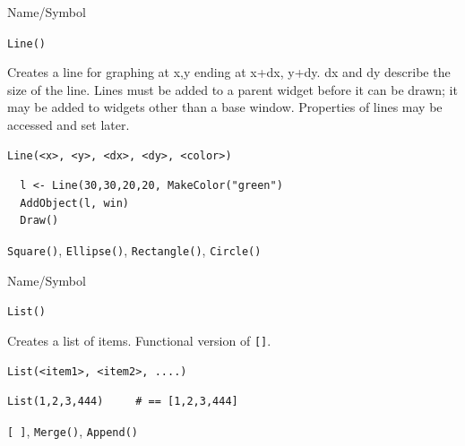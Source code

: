 \begin{desc}{Name/Symbol}
\item[Name/Symbol]	\verb+Line()+

\item[Description] Creates a line for graphing at x,y ending at x+dx,
  y+dy.  dx and dy describe the size of the line.  Lines must be added
  to a parent widget before it can be drawn; it may be added to
  widgets other than a base window. Properties of lines may be
  accessed and set later.

\item[Usage]
\begin{verbatim}
Line(<x>, <y>, <dx>, <dy>, <color>)
\end{verbatim}

\item[Example]	
\begin{verbatim}
  l <- Line(30,30,20,20, MakeColor("green")
  AddObject(l, win)
  Draw()

\end{verbatim}
\item[See Also]	\verb+Square()+, \verb+Ellipse()+, \verb+Rectangle()+, \verb+Circle()+
\end{desc}
\begin{desc}{Name/Symbol}
\item[Name/Symbol]	\verb+List()+

\item[Description]	Creates a list of items. Functional version of \verb+[]+.

\item[Usage]
\begin{verbatim}
List(<item1>, <item2>, ....)
\end{verbatim}

\item[Example]
\begin{verbatim}
List(1,2,3,444)		# == [1,2,3,444]
\end{verbatim}

\item[See Also]	\verb+[ ]+, \verb+Merge()+, \verb+Append()+
\end{desc}

